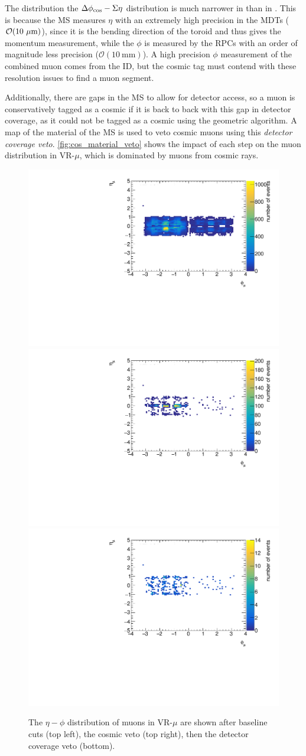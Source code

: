 The distribution the $\Delta \phi_{\text{cos}}-\Sigma \eta$ distribution is much narrower in \sigeta than in \dphicos. This is because the \ac{MS} measures $\eta$ with an extremely high precision in the \acp{MDT} ($\mathcal{O}(10~\mu\text{m})$), since it is the bending direction of the toroid and thus gives the momentum measurement, while the $\phi$ is measured by the \acp{RPC} with an order of magnitude less precision ($\mathcal{O}(10~\text{mm})$). A high precision $\phi$ measurement of the combined muon comes from the \ac{ID}, but the cosmic tag must contend with these resolution issues to find a muon segment.

Additionally, there are gaps in the \ac{MS} to allow for detector access, so a muon is conservatively tagged as a cosmic if it is back to back with this gap in detector coverage, as it could not be tagged as a cosmic using the geometric algorithm. A map of the material of the \ac{MS} is used to veto cosmic muons using this \emph{detector coverage veto}. \autoref{fig:cos_material_veto} shows the impact of each step on the muon distribution in VR-$\mu$, which is dominated by muons from cosmic rays.


\begin{figure}[!ht]
\centering
\includegraphics[width=.48\textwidth]{figures/cosmics/v4_widetag_2_eta_phi_baseline.pdf}
\includegraphics[width=.48\textwidth]{figures/cosmics/v4_widetag_2_eta_phi_costag.pdf}
\includegraphics[width=.48\textwidth]{figures/cosmics/v4_widetag_2_eta_phi_costag_mv.pdf}
\caption{The $\eta-\phi$ distribution of muons in VR-$\mu$ are shown after baseline cuts (top left), the cosmic veto (top right), then the detector coverage veto (bottom).}
\label{fig:cos_material_veto}
\end{figure}

